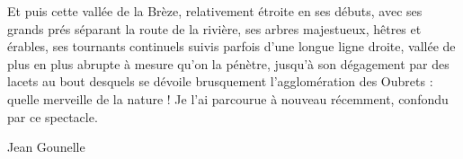 Et puis cette vallée de la Brèze, relativement étroite en ses débuts, avec ses grands prés
séparant la route de la rivière, ses arbres majestueux, hêtres et érables, ses tournants
continuels suivis parfois d’une longue ligne droite, vallée de plus en plus abrupte à
mesure qu’on la pénètre, jusqu’à son dégagement par des lacets au bout desquels se
dévoile brusquement l’agglomération des Oubrets : quelle merveille de la nature ! Je
l’ai parcourue à nouveau récemment, confondu par ce spectacle.

\hfill Jean Gounelle
